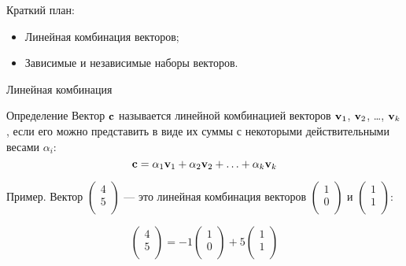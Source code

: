 
\begin{frame} %


\end{frame}



\begin{frame}{Краткий план:}
  \begin{itemize}[<+->]
    \item Линейная комбинация векторов;
    \item Зависимые и независимые наборы векторов.
  \end{itemize}

\end{frame}


\begin{frame}{Линейная комбинация}

\begin{block}{Определение} 
Вектор $\mathbf{c}$ называется \alert{линейной комбинацией} векторов $\mathbf{v}_1$, $\mathbf{v}_2$, \ldots, $\mathbf{v}_k$, 
если его можно представить в виде их суммы с некоторыми действительными весами $\alpha_i$:
\[
  \mathbf{c} = \alpha_1 \mathbf{v}_1 + \alpha_2 \mathbf{v}_2 + \ldots + \alpha_k \mathbf{v}_k
\]
\end{block}

\pause
Пример. Вектор $\begin{pmatrix}
  4 \\
  5 \\
\end{pmatrix}$ — это линейная комбинация векторов $\begin{pmatrix}
  1 \\
  0 \\
\end{pmatrix}$ и $\begin{pmatrix}
  1 \\
  1 \\
\end{pmatrix}$:

\[
\begin{pmatrix}
  4 \\
  5 \\
\end{pmatrix} = -1 \begin{pmatrix}
  1 \\
  0 \\
\end{pmatrix} + 5 \begin{pmatrix}
  1 \\
  1 \\
\end{pmatrix}  
\]


\end{frame}



